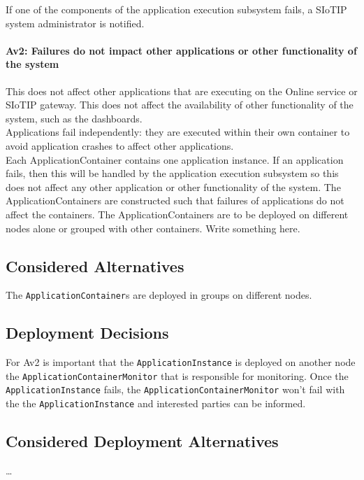            If one of the components of the application execution subsystem fails,
            a SIoTIP system administrator is notified.
            
        \paragraph{Av2: Failures do not impact other applications or other functionality of the system}
            This does not affect other applications that are executing on the Online
            service or SIoTIP gateway. This does not affect the availability of
            other functionality of the system, such as the dashboards. \\
            Applications fail independently: they are executed within their own
            container to avoid application crashes to affect other applications.\\

            Each ApplicationContainer contains one application instance. If an application fails,
            then this will be handled by the application execution subsystem so this
            does not affect any other application or other functionality of the system.
            The ApplicationContainers are constructed such that failures of applications
            do not affect the containers. The ApplicationContainers are to be deployed
            on different nodes alone or grouped with other containers. Write something here.

    \subsection*{Considered Alternatives}
         The \texttt{ApplicationContainer}s are deployed in groups on different nodes.

    \subsection*{Deployment Decisions}
        For Av2 is important that the \texttt{ApplicationInstance} is deployed on another node the \texttt{ApplicationContainerMonitor} that is responsible for
        monitoring. Once the \texttt{ApplicationInstance} fails, the \texttt{ApplicationContainerMonitor} won't fail with the the \texttt{ApplicationInstance}
        and interested parties can be informed.
        
    \subsection*{Considered Deployment Alternatives}
        \ldots
